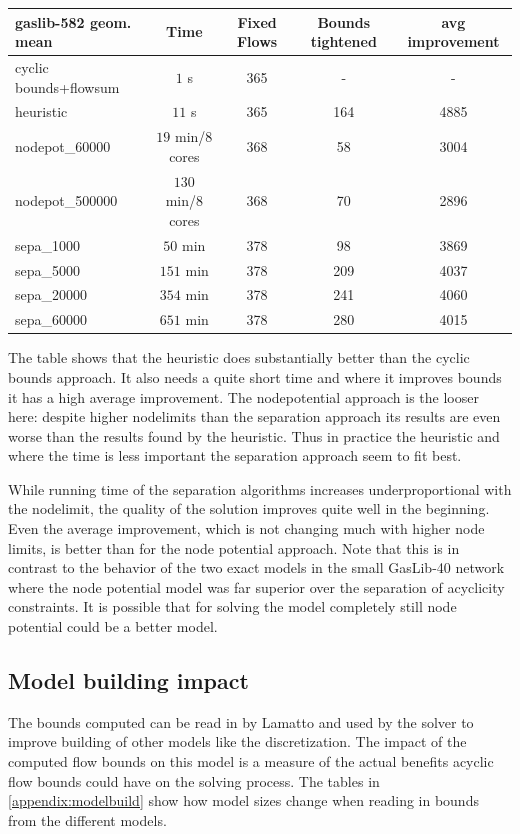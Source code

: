 \begin{center}
\begin{tabular}{ l | c | c | c | c }
\textbf{gaslib-582 geom. mean} & Time  & Fixed Flows & Bounds tightened & avg improvement \\
\hline
 cyclic bounds+flowsum& $1$ s& 365 & - & -\\
 heuristic& $ 11$ s& 365& 164 & 4885 \\
 nodepot\_60000& $19$ min/8 cores & 368 &58  &  3004 \\ 
 nodepot\_500000& $130$ min/8 cores & 368 &70  & 2896 \\ 
 sepa\_1000& $ 50$ min & 378 & 98 & 3869 \\
 sepa\_5000& $ 151$ min & 378 & 209 & 4037 \\
 sepa\_20000& $ 354$ min & 378 & 241 & 4060 \\
 sepa\_60000& $ 651$ min  & 378& 280& 4015\\
\end{tabular} 
\end{center}

The table shows that the heuristic does substantially better than the cyclic bounds approach. It also needs a quite 
short time and where it improves bounds it has a high average improvement. The nodepotential approach is the looser 
here: despite higher nodelimits than the separation approach its results are even worse than the results found 
by the heuristic. Thus in practice the heuristic and where the time is less important the separation approach seem to 
fit best. 

While running time of the separation algorithms increases underproportional with the nodelimit, the quality of the 
solution improves quite well in the beginning. Even the average improvement, which is not changing much with higher 
node limits, is better than for the node potential approach. Note that this is in contrast to the behavior of 
the two exact models in the small GasLib-40 network where the node potential model was far superior over the separation 
of acyclicity constraints. It is possible that for solving the model completely still node potential could be a better 
model.


\subsection{Model building impact}
The bounds computed can be read in by Lamatto and used by the solver to improve building of other models like the 
discretization. The impact of the computed flow bounds on this model is a measure of the actual benefits acyclic 
flow bounds could have on the solving process. The tables in \ref{appendix:modelbuild} show how model sizes change when 
reading in bounds from the different models.


